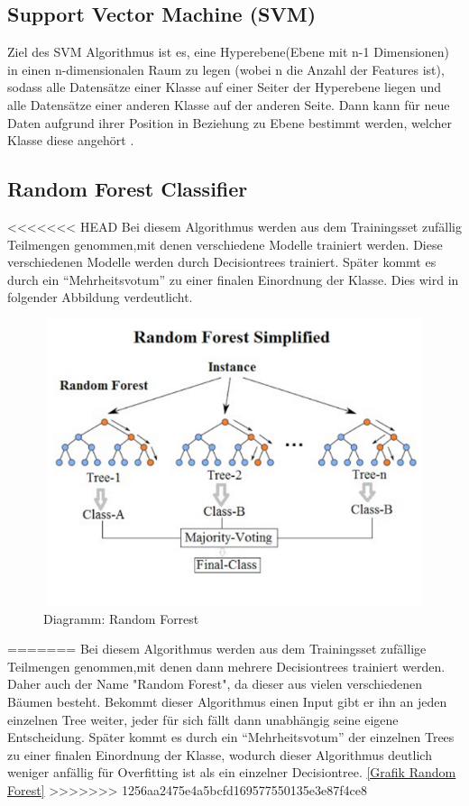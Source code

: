 \subsection{Support Vector Machine (\ac{SVM})}
\label{sec:SVM}
Ziel des \ac{SVM} Algorithmus ist es, eine Hyperebene(Ebene mit n-1 Dimensionen) in einen n-dimensionalen Raum zu legen (wobei n die Anzahl der Features ist), sodass alle Datensätze einer Klasse auf einer Seiter der Hyperebene liegen und alle Datensätze einer anderen Klasse auf der anderen Seite. Dann kann für neue Daten aufgrund ihrer Position in Beziehung zu Ebene bestimmt werden, welcher Klasse diese angehört \cite[S.~177f.]{WML}.

\subsection{Random Forest Classifier}
\label{sec:RFC}
<<<<<<< HEAD
Bei diesem Algorithmus  werden aus dem Trainingsset zufällig Teilmengen genommen,mit denen verschiedene Modelle trainiert werden\cite[S.~256]{MB}. Diese verschiedenen Modelle werden durch Decisiontrees trainiert. Später kommt es durch ein “Mehrheitsvotum” zu einer finalen Einordnung der Klasse\cite{MED}.  Dies wird in folgender Abbildung verdeutlicht.

\begin{figure}
	\includegraphics[width=1.0\textwidth]{../Bilder/1_i0o8mjFfCn-uD79-F1Cqkw.png}
	\caption{Diagramm: Random Forrest}
\end{figure}
=======
Bei diesem Algorithmus  werden aus dem Trainingsset zufällige Teilmengen genommen,mit denen dann mehrere Decisiontrees trainiert werden. Daher auch der Name "Random Forest", da dieser aus vielen verschiedenen Bäumen besteht\cite[p.~256]{MB}. Bekommt dieser Algorithmus einen Input gibt er ihn an jeden einzelnen Tree weiter, jeder für sich fällt dann unabhängig seine eigene Entscheidung. Später kommt es durch ein “Mehrheitsvotum” der einzelnen Trees zu einer finalen Einordnung der Klasse, wodurch dieser Algorithmus deutlich weniger anfällig für Overfitting ist als ein einzelner Decisiontree\cite{MED}. \hyperlink{einführungMachineLearning}{[Grafik Random Forest]}
>>>>>>> 1256aa2475e4a5bcfd169577550135e3e87f4ce8

